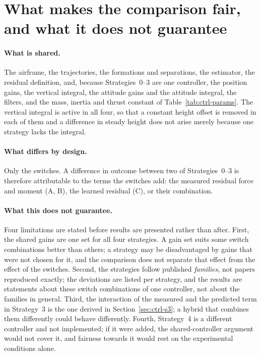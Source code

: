 \section{What makes the comparison fair, and what it does not guarantee}
\label{sec:ctrl-fairness}

\paragraph{What is shared.} The airframe, the trajectories, the formations and separations, the
estimator, the residual definition, and, because Strategies~0--3 are one controller, the position
gains, the vertical integral, the attitude gains and the attitude integral, the filters, and the
mass, inertia and thrust constant of Table~\ref{tab:ctrl-params}. The vertical integral is active in
all four, so that a constant height offset is removed in each of them and a difference in steady
height does not arise merely because one strategy lacks the integral.

\paragraph{What differs by design.} Only the switches. A difference in outcome between two of
Strategies~0--3 is therefore attributable to the terms the switches add: the measured residual force
and moment (A, B), the learned residual (C), or their combination.

\paragraph{What this does not guarantee.} Four limitations are stated before results are presented
rather than after. First, the shared gains are one set for all four strategies. A gain set suits
some switch combinations better than others; a strategy may be disadvantaged by gains that were not
chosen for it, and the comparison does not separate that effect from the effect of the switches.
Second, the strategies follow published \emph{families}, not papers reproduced exactly; the
deviations are listed per strategy, and the results are statements about these switch combinations
of one controller, not about the families in general. Third, the interaction of the measured and
the predicted term in Strategy~3 is the one derived in Section~\ref{sec:ctrl-s3}; a hybrid that
combines them differently could behave differently. Fourth, Strategy~4 is a different controller
and not implemented; if it were added, the shared-controller argument would not cover it, and
fairness towards it would rest on the experimental conditions alone.

